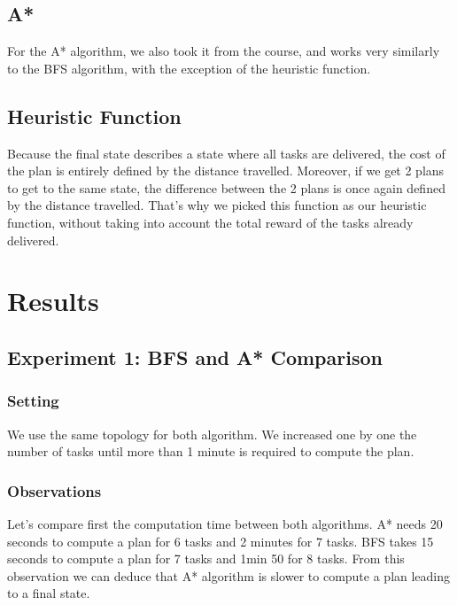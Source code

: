 \documentclass[11pt]{article}
\begin{document}
\subsection{A*}
For the A* algorithm, we also took it from the course, and works very similarly to the BFS algorithm, with the exception of the heuristic function.

\subsection{Heuristic Function}
Because the final state describes a state where all tasks are delivered, the cost of the plan is entirely defined by the distance travelled. Moreover, if we get 2 plans to get to the same state, the difference between the 2 plans is once again defined by the distance travelled. That's why we picked this function as our heuristic function, without taking into account the total reward of the tasks already delivered.

\section{Results}

\subsection{Experiment 1: BFS and A* Comparison}

\subsubsection{Setting}
We use the same topology for both algorithm. We increased one by one the number of tasks until more than 1 minute is required to compute the plan.

\subsubsection{Observations}
Let's compare first the computation time between both algorithms. A* needs 20 seconds to compute a plan for 6 tasks and 2 minutes for 7 tasks. BFS takes 15 seconds to compute a plan for 7 tasks and 1min 50 for 8 tasks. From this observation we can deduce that A* algorithm is slower to compute a plan leading to a final state.
\end{document}
